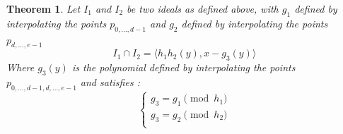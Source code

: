 \documentclass{article}
\newtheorem{theorem}{Theorem}[section]
\begin{document}
\begin{flushleft}
\begin{theorem} 
    Let $I_{1}$ and $I_{2}$ be two ideals as defined above, with $g_{1}$ defined by interpolating the points $p_{0,\dots,d-1}$ and $g_{2}$ defined by interpolating the points $p_{d,\dots,e-1}$
    \begin{displaymath}
        I_{1} \cap I_{2} = \langle h_{1}h_{2}(y), x - g_{3}(y) \rangle
    \end{displaymath}
    Where $g_{3}(y)$ is the polynomial defined by interpolating the points $p_{0,\dots,d-1,d,\dots,e-1}$ and satisfies :
    \begin{displaymath}
    \left\{
    \begin{array}{ll}
        g_{3} = g_{1} \pmod {h_{1}} \\
        g_{3} = g_{2} \pmod {h_{2}} \\
    \end{array}
    \right.
    \end{displaymath} 
\end{theorem}


\end{flushleft}
\end{document}
